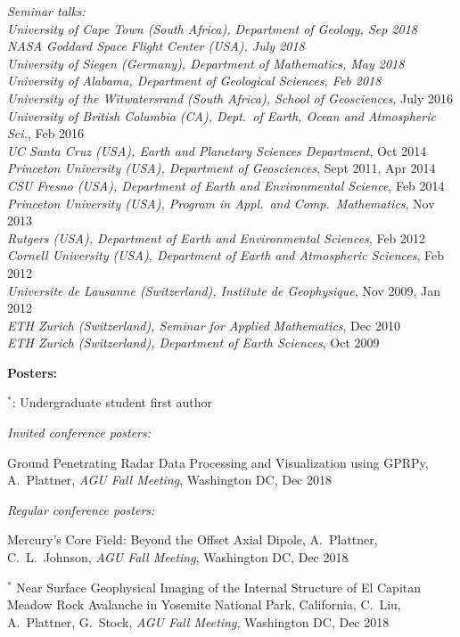 \documentclass[10pt]{article}
\begin{document}
\spc
\emph{Seminar talks:}\\
\emph{University of Cape Town (South Africa), Department of Geology, Sep 2018}\\
\emph{NASA Goddard Space Flight Center (USA), July 2018}\\
\emph{University of Siegen (Germany), Department of Mathematics, May 2018}\\
\emph{University of Alabama, Department of Geological Sciences, Feb 2018}\\
\emph{University of the Witwatersrand (South Africa), School of Geosciences}, July 2016\\
\emph{University of British Columbia (CA), Dept.~of Earth, Ocean and Atmospheric Sci.}, Feb 2016\\
\emph{UC Santa Cruz (USA), Earth and Planetary Sciences Department}, Oct 2014\\
\emph{Princeton University (USA), Department of Geosciences}, Sept  2011, Apr 2014\\
\emph{CSU Fresno (USA), Department of Earth and Environmental Science}, Feb 2014\\
\emph{Princeton University (USA), Program in Appl.~and Comp.~Mathematics}, Nov 2013\\
\emph{Rutgers (USA), Department of Earth and Environmental Sciences}, Feb 2012\\
\emph{Cornell University (USA), Department of Earth and Atmospheric Sciences}, Feb 2012\\
\emph{Universite de Lausanne (Switzerland), Institute de Geophysique}, Nov 2009, Jan 2012\\
\emph{ETH Zurich (Switzerland), Seminar for Applied Mathematics}, Dec 2010\\
\emph{ETH Zurich (Switzerland), Department of Earth Sciences}, Oct 2009

\clearpage
\textbf{\tsize Posters:}

\spcp
$^*$: Undergraduate student first author

\spcp
\emph{Invited conference posters:}

\spcp
Ground Penetrating Radar Data Processing and Visualization using
GPRPy,
A.~Plattner,
\emph{AGU Fall Meeting}, Washington DC, Dec 2018 


\spcp
\emph{Regular conference posters:}

\spcp
Mercury's Core Field: Beyond the Offset Axial Dipole,
A.~Plattner, C.~L.~Johnson, 
\emph{AGU Fall Meeting}, Washington DC, Dec 2018 

\spcp
\hspace{-0.4cm} $^*$ Near Surface Geophysical Imaging of the Internal
Structure of El Capitan Meadow Rock Avalanche in Yosemite National
Park, California,
C.~Liu, A.~Plattner, G.~Stock,
\emph{AGU Fall Meeting}, Washington DC, Dec 2018
\end{document}
